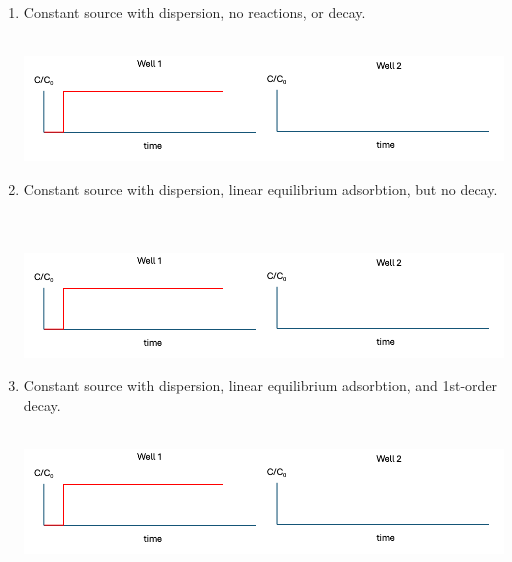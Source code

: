 \documentclass[12pt]{article}
\begin{document}
\begin{enumerate}
\begin{enumerate}
\item Constant source with dispersion, no reactions, or decay. ~\\~\\
\begin{center}
\includegraphics[width=6in]{WellsHistory.png} 
\end{center}
\clearpage %
\item Constant source with dispersion, linear equilibrium adsorbtion, but no decay. ~\\~\\
\begin{center}
\includegraphics[width=6in]{WellsHistory.png} 
\end{center}
\item Constant source with dispersion, linear equilibrium adsorbtion, and 1st-order decay. ~\\~\\
\begin{center}
\includegraphics[width=6in]{WellsHistory.png} 

\end{center}
\end{enumerate}
\end{enumerate}
\end{document}
